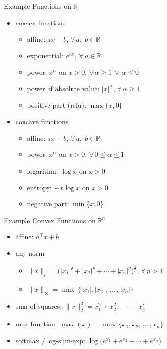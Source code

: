 \documentclass[10pt]{beamer}
\newcommand{\ds}{\displaystyle}
\theoremstyle{definition}
\begin{document}
\begin{frame}{Example Functions on $\mathbb{R}$}

\begin{itemize}
  \item convex functions
    \begin{itemize}
      \item affine: $\ds ax + b$, $\forall\,a,\;b\in\mathbb{R}$
      \item exponential: $\ds e^{a x}$, $\forall\,a\in\mathbb{R}$
      \item power: $\ds x^\alpha$ on $x > 0$, $\forall\,\alpha\geqslant 1\,\vee\,\alpha\leqslant 0$
      \item power of absolute value: $\ds |x|^\alpha$, $\forall\,\alpha\geqslant 1$
      \item positive part (relu): $\max\{x, 0\}$
    \end{itemize}
  \item concave functions
    \begin{itemize}
      \item affine: $\ds ax + b$, $\forall\,a,\;b\in\mathbb{R}$
      \item power: $\ds x^\alpha$ on $x > 0$, $\forall\,0\leqslant\alpha\leqslant 1$
      \item logarithm: $\ds\log x$ on $x > 0$
      \item entropy: $\ds -x\log x$ on $x > 0$ 
      \item negative part: $\min\{x, 0\}$
    \end{itemize}
\end{itemize}

\end{frame}

\begin{frame}{Example Convex Functions on $\mathbb{R}^n$}

\begin{itemize}
  \item affine: $\ds a^\top\!x + b$
  \item any norm 
    \begin{itemize}
      \item $\ds\|x\|_p = \big(|x_1|^p + |x_2|^p + \cdots + |x_n|^p\big)^{\frac{1}{p}}$, $\forall\,p > 1$
      \item $\ds\|x\|_\infty = \max\,\{|x_1|, |x_2|,\,\ldots\,,|x_n|\}$
    \end{itemize}
  \item sum of squares: $\ds\|x\|_2^2 = x_1^2 + x_2^2 + \cdots + x_n^2$
  \item max function: $\ds\max(x) = \max\,\{x_1, x_2,\,\ldots\,,x_n\}$
  \item softmax / log-sum-exp: $\ds\log\big(e^{x_1} + e^{x_2} + \cdots + e^{x_n}\big)$
\end{itemize}

\end{frame}
\end{document}
